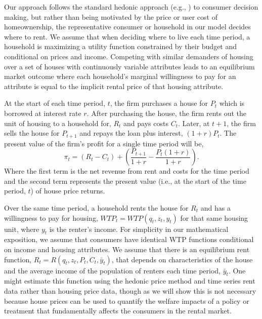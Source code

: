\documentclass[ecta,nameyear,draft]{econsocart}
\theoremstyle{plain}
\theoremstyle{remark}
\begin{document}
Our approach follows the standard hedonic approach (e.g., \cite{rosen74}) to consumer decision making, but rather than being motivated by the price or user cost of homeownership, the representative consumer or household in our model decides where to rent. We assume that when deciding where to live each time period, a household is maximizing a utility function constrained by their budget and conditional on prices and income. Competing with similar demanders of housing over a set of houses with continuously variable attributes leads to an equilibrium market outcome where each household's marginal willingness to pay for an attribute is equal to the implicit rental price of that housing attribute. 

At the start of each time period, $t$, the firm purchases a house for $P_t$ which is borrowed at interest rate $r$. After purchasing the house, the firm rents out the unit of housing to a household for, $R_t$ and pays costs $C_t$. Later, at $t+1$, the firm sells the house for $P_{t+1}$ and repays the loan plus interest, $(1 + r)P_t$.  The present value of the firm’s profit for a single time period will be,
\begin{equation}
	\pi_t = (R_t-C_t)+\left(\frac{P_{t+1}}{1+r}-\frac{P_t(1+r)}{1+r}\right).\label{pi1}
\end{equation}
Where the first term is the net revenue from rent and costs for the time period and the second term
represents the present value (i.e., at the start of the time period, $t$) of house price returns.

Over the same time period, a household rents the house for $R_t$ and has a willingness to pay for housing, $\mathit{WTP}_t=\mathit{WTP}(q_t,z_t,y_t)$ for that same housing unit, where $y_t$ is the renter's income. For simplicity in our mathematical exposition, we assume that consumers have identical WTP functions conditional on income and housing attributes. We  assume that there is an equilibrium rent function, $R_t=R(q_t,z_t,P_t,C_t,\bar{y}_t)$, that depends on characteristics of the house and the average income of the population of renters each time period, $\bar{y}_t$. One might estimate this function using the hedonic price method and time series rent data rather than housing price data, though as we will show this is not necessary because house prices can be used to quantify the welfare impacts of a policy or treatment that fundamentally affects the consumers in the rental market. 
\end{document}
